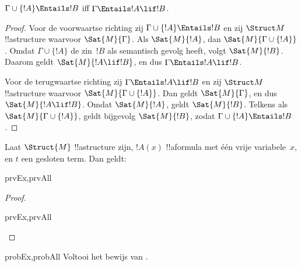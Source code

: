 \documentclass[../../../include/open-logic-section]{subfiles}
\begin{document}
\begin{thm}
$\Gamma \cup \{!A\} \Entails !B$ iff $\Gamma \Entails !A \lif !B$.
\end{thm}

\begin{proof}
Voor de voorwaartse richting zij
$\Gamma \cup \{ !A \} \Entails !B$ en zij $\Struct M$
!!a{structure} waarvoor $\Sat{M}{\Gamma}$. Als $\Sat{M}{!A}$, dan
$\Sat{M}{\Gamma \cup \{ !A \} }$. Omdat $\Gamma \cup \{ !A \}$ de
zin~$!B$ als semantisch gevolg heeft, volgt $\Sat{M}{!B}$. Daarom geldt
$\Sat{M}{!A \lif !B}$, en dus $\Gamma \Entails !A \lif !B$.

Voor de terugwaartse richting zij
$\Gamma \Entails !A \lif !B$ en zij $\Struct M$ !!a{structure}
waarvoor $\Sat{M}{\Gamma \cup \{ !A \}}$. Dan geldt
$\Sat{M}{\Gamma}$, en dus $\Sat{M}{!A \lif !B}$. Omdat
$\Sat{M}{!A}$, geldt $\Sat{M}{!B}$. Telkens als
$\Sat{M}{\Gamma \cup \{ !A \} }$, geldt bijgevolg $\Sat{M}{!B}$, zodat
$\Gamma \cup \{ !A \} \Entails !B$.
\end{proof}

\begin{prop}
  Laat $\Struct{M}$ !!a{structure} zijn, $!A(x)$ !!a{formula} met één
  vrije variabele~$x$, en $t$ een gesloten term. Dan geldt:
  \begin{tagenumerate}{prvEx,prvAll}
  \end{tagenumerate}
\end{prop}

\begin{proof}
  \begin{tagenumerate}{prvEx,prvAll}
  \end{tagenumerate}
\end{proof}

\begin{probtag}{probEx,probAll}
  Voltooi het bewijs van .
\end{probtag} 
\end{document}
